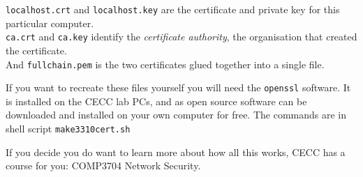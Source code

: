 \texttt{localhost.crt} and \texttt{localhost.key} are the certificate and private key
for this particular computer. \\
\texttt{ca.crt} and \texttt{ca.key} identify the \emph{certificate authority}, the
organisation that created the certificate. \\
And \texttt{fullchain.pem} is the two certificates glued together into a
single file.

If you want to recreate these files yourself you will need the \texttt{openssl} software.
It is installed on the CECC lab PCs, and as open source software can be downloaded
and installed on your own computer for free.
The commands are in shell script \texttt{make3310cert.sh}

If you decide you do want to learn more about how all this works, CECC
has a course for you: COMP3704 Network Security.

\COPYRIGHT


